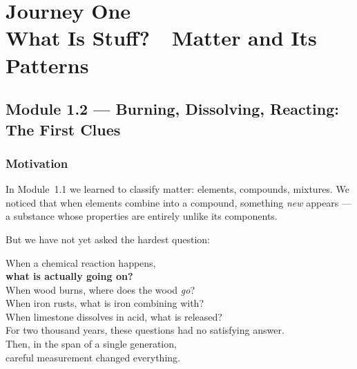 \documentclass[12pt, a4paper]{book}
\theoremstyle{definition}
\begin{document}
\setcounter{chapter}{0}   %


\chapter[Journey 1 — What Is Stuff?]
        {Journey One\\[8pt]
         \textcolor{ModuleColor}{\large What Is Stuff?\ \ Matter and Its Patterns}}

\setcounter{section}{1}   %

\section{Module 1.2 — Burning, Dissolving, Reacting: The First Clues}
\label{sec:mod1.2}

\subsection*{Motivation}

In Module~1.1 we learned to classify matter:
elements, compounds, mixtures.
We noticed that when elements combine into a compound,
something \emph{new} appears — a substance whose properties
are entirely unlike its components.

But we have not yet asked the hardest question:

\begin{center}
\begin{tcolorbox}[
  enhanced, colback=LightBg, colframe=JourneyColor!40,
  width=0.86\textwidth, arc=3pt,
  fontupper=\sffamily
]
\centering
When a chemical reaction happens,\\[4pt]
\textbf{what is actually going on?}\\[6pt]
\small
When wood burns, where does the wood \emph{go}?\\
When iron rusts, what is iron combining with?\\
When limestone dissolves in acid, what is released?\\[4pt]
\normalsize
For two thousand years, these questions had no satisfying answer.\\
Then, in the span of a single generation,\\
careful measurement changed everything.
\end{tcolorbox}
\end{center}
\end{document}

